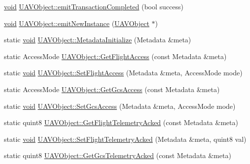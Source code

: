 \begin{DoxyCompactItemize}
\hyperlink{group___u_a_v_objects_plugin_ga444cf2ff3f0ecbe028adce838d373f5c}{void} \hyperlink{group___u_a_v_objects_plugin_ga30c0ae6383f58843feca4919232f0478}{\-U\-A\-V\-Object\-::emit\-Transaction\-Completed} (bool success)
\item 
\hyperlink{group___u_a_v_objects_plugin_ga444cf2ff3f0ecbe028adce838d373f5c}{void} \hyperlink{group___u_a_v_objects_plugin_ga6085b5c08522017f9a59a087f7ccc073}{\-U\-A\-V\-Object\-::emit\-New\-Instance} (\hyperlink{class_u_a_v_object}{\-U\-A\-V\-Object} $\ast$)
\item 
static \hyperlink{group___u_a_v_objects_plugin_ga444cf2ff3f0ecbe028adce838d373f5c}{void} \hyperlink{group___u_a_v_objects_plugin_ga0e0e6753710634f75bf5f27e0c3e073a}{\-U\-A\-V\-Object\-::\-Metadata\-Initialize} (\-Metadata \&meta)
\item 
static \-Access\-Mode \hyperlink{group___u_a_v_objects_plugin_ga98889e5102c4c2d2c9f1a47c03633218}{\-U\-A\-V\-Object\-::\-Get\-Flight\-Access} (const \-Metadata \&meta)
\item 
static \hyperlink{group___u_a_v_objects_plugin_ga444cf2ff3f0ecbe028adce838d373f5c}{void} \hyperlink{group___u_a_v_objects_plugin_gaa660f23e03de07c425e5162e2dc42c4f}{\-U\-A\-V\-Object\-::\-Set\-Flight\-Access} (\-Metadata \&meta, \-Access\-Mode mode)
\item 
static \-Access\-Mode \hyperlink{group___u_a_v_objects_plugin_ga7efd83f9d2ce75464022ed2e05c33920}{\-U\-A\-V\-Object\-::\-Get\-Gcs\-Access} (const \-Metadata \&meta)
\item 
static \hyperlink{group___u_a_v_objects_plugin_ga444cf2ff3f0ecbe028adce838d373f5c}{void} \hyperlink{group___u_a_v_objects_plugin_ga55ae4b0f44dc39c52da3d4173345c19b}{\-U\-A\-V\-Object\-::\-Set\-Gcs\-Access} (\-Metadata \&meta, \-Access\-Mode mode)
\item 
static quint8 \hyperlink{group___u_a_v_objects_plugin_ga98522650b206f948c9141115c15d1d13}{\-U\-A\-V\-Object\-::\-Get\-Flight\-Telemetry\-Acked} (const \-Metadata \&meta)
\item 
static \hyperlink{group___u_a_v_objects_plugin_ga444cf2ff3f0ecbe028adce838d373f5c}{void} \hyperlink{group___u_a_v_objects_plugin_ga92f2e8fef7adb87575582d52a4d90519}{\-U\-A\-V\-Object\-::\-Set\-Flight\-Telemetry\-Acked} (\-Metadata \&meta, quint8 val)
\item 
static quint8 \hyperlink{group___u_a_v_objects_plugin_ga3bfcc38f5830eeea1369a6e7c3aa3214}{\-U\-A\-V\-Object\-::\-Get\-Gcs\-Telemetry\-Acked} (const \-Metadata \&meta)
\item 

\end{DoxyCompactItemize}

